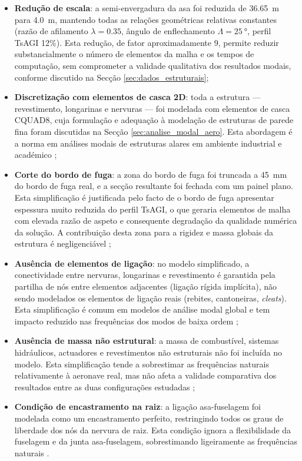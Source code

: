 \documentclass[a4paper,fleqn]{cas-sc}
\begin{document}
\begin{itemize}
    \item \textbf{Redução de escala}: a semi-envergadura da asa foi reduzida de \SI{36.65}{\meter} para \SI{4.0}{\meter}, mantendo todas as relações geométricas relativas constantes (razão de afilamento $\lambda = 0.35$, ângulo de enflechamento $\Lambda = \qty{25}{\degree}$, perfil TsAGI 12\%). Esta redução, de fator aproximadamente 9, permite reduzir substancialmente o número de elementos da malha e os tempos de computação, sem comprometer a validade qualitativa dos resultados modais, conforme discutido na Secção \ref{sec:dados_estruturais};

    \item \textbf{Discretização com elementos de casca 2D}: toda a estrutura --- revestimento, longarinas e nervuras --- foi modelada com elementos de casca CQUAD8, cuja formulação e adequação à modelação de estruturas de parede fina foram discutidas na Secção \ref{sec:analise_modal_aero}. Esta abordagem é a norma em análises modais de estruturas alares em ambiente industrial e académico \cite{Nastran2014, Cook2001};

    \item \textbf{Corte do bordo de fuga}: a zona do bordo de fuga foi truncada a \SI{45}{\milli\meter} do bordo de fuga real, e a secção resultante foi fechada com um painel plano. Esta simplificação é justificada pelo facto de o bordo de fuga apresentar espessura muito reduzida do perfil TsAGI, o que geraria elementos de malha com elevada razão de aspeto e consequente degradação da qualidade numérica da solução. A contribuição desta zona para a rigidez e massa globais da estrutura é negligenciável \cite{Bathe2014};

    \item \textbf{Ausência de elementos de ligação}: no modelo simplificado, a conectividade entre nervuras, longarinas e revestimento é garantida pela partilha de nós entre elementos adjacentes (ligação rígida implícita), não sendo modelados os elementos de ligação reais (rebites, cantoneiras, \textit{cleats}). Esta simplificação é comum em modelos de análise modal global e tem impacto reduzido nas frequências dos modos de baixa ordem \cite{Wright2015};

    \item \textbf{Ausência de massa não estrutural}: a massa de combustível, sistemas hidráulicos, actuadores e revestimentos não estruturais não foi incluída no modelo. Esta simplificação tende a sobrestimar as frequências naturais relativamente à aeronave real, mas não afeta a validade comparativa dos resultados entre as duas configurações estudadas \cite{Craig2006};

    \item \textbf{Condição de encastramento na raiz}: a ligação asa-fuselagem foi modelada como um encastramento perfeito, restringindo todos os graus de liberdade dos nós da nervura de raiz. Esta condição ignora a flexibilidade da fuselagem e da junta asa-fuselagem, sobrestimando ligeiramente as frequências naturais \cite{Hodges2011}.
\end{itemize}
\end{document}
